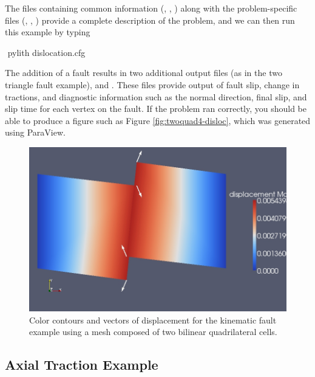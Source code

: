 The files containing common information (,
, ) along with
the problem-specific files (,
,
) provide a complete
description of the problem, and we can then run this example by typing
\begin{shell}
$$ pylith dislocation.cfg
\end{shell}
The addition of a fault results in two additional output files (as in
the two triangle fault example),
 and
.  These files provide output of
fault slip, change in tractions, and diagnostic information such as
the normal direction, final slip, and slip time for each vertex on the
fault. If the problem ran correctly, you should be able to produce a
figure such as Figure \vref{fig:twoquad4-disloc}, which was generated
using ParaView.

\begin{figure}
  \includegraphics[scale=0.33]{examples/figs/twoquad4-dislocation}
  \caption{Color contours and vectors of displacement for the kinematic fault
    example using a mesh composed of two bilinear quadrilateral cells.}
  \label{fig:twoquad4-disloc}
\end{figure}


\subsection{Axial Traction Example}
\label{sec:examples:twoquad4-traction}

